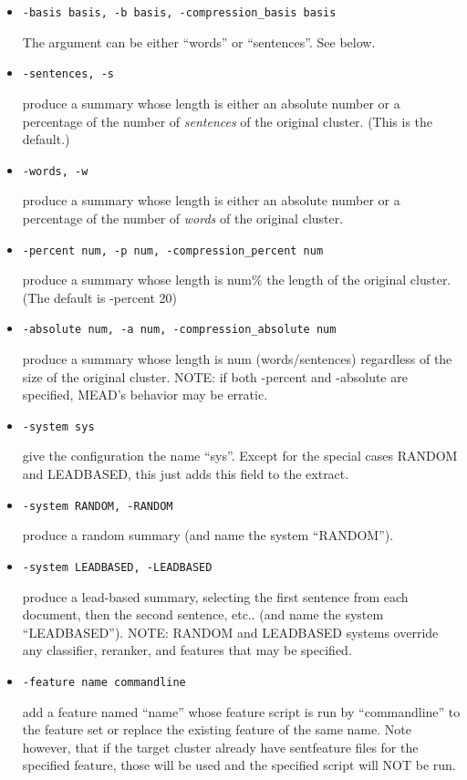 \documentclass[10pt]{article}
\begin{document}
\begin{itemize}
\item \verb|-basis basis, -b basis, -compression_basis basis|

  The argument can be either  ``words'' or ``sentences''.  See below.

\item \verb|-sentences, -s|
  
  produce a summary whose length is either an absolute number or
  a percentage of the number of {\it sentences} of the original cluster.
  (This is the default.)

\item \verb|-words, -w|
  
  produce a summary whose length is either an absolute number or 
  a percentage of the number of {\it words} of the original cluster.

\item \verb|-percent num, -p num, -compression_percent num|
  
  produce a summary whose length is num\% the length of the
  original cluster. (The default is -percent 20)

\item \verb|-absolute num, -a num, -compression_absolute num|
  
  produce a summary whose length is num (words/sentences) regardless of the
  size of the original cluster.  NOTE: if both -percent and -absolute are
  specified, MEAD's behavior may be erratic.

\item \verb|-system sys|
  
  give the configuration the name ``sys''.  Except for the special cases 
  RANDOM and LEADBASED, this just adds this field to the extract.

\item \verb|-system RANDOM, -RANDOM|
  
  produce a random summary (and name the system ``RANDOM'').

\item \verb|-system LEADBASED, -LEADBASED|
  
  produce a lead-based summary, selecting the first sentence from each 
  document, then the second sentence, etc.. 
  (and name the system ``LEADBASED'').  NOTE: RANDOM and LEADBASED systems
  override any classifier, reranker, and features that may be specified.

\item \verb|-feature name commandline|
  
  add a feature named ``name'' whose feature script is run
  by ``commandline'' to the feature set or replace the existing feature
  of the same name.  Note however, that if the target cluster already
  have sentfeature files for the specified feature, those will be
  used and the specified script will NOT be run.


\end{itemize}
\end{document}
